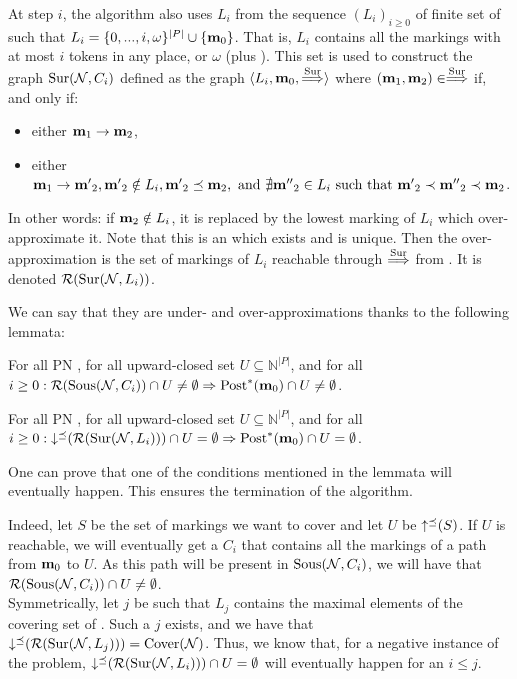 At step $i$, the algorithm also uses $L_i$ from the sequence $(L_i)_{i \geq 0}$ of finite set of \omarks such that $L_i = \{0, ..., i, \omega \}^{|P|} \cup \{\mathbf{m}_0\}$.
That is, $L_i$ contains all the markings with at most $i$ tokens in any place, or $\omega$ (plus \mari).
This set is used to construct the graph $\operatorname{Sur}(\mathcal{N}, C_i)$ defined as the graph $\langle L_i, \mathbf{m}_0, \stackrel{\operatorname{Sur}}{\Longrightarrow} \rangle$ where $(\mathbf{m}_1, \mathbf{m}_2) \in \stackrel{\operatorname{Sur}}{\Longrightarrow}$ if, and only if:
\begin{itemize}
  \item either $\mathbf{m}_1 \rightarrow \mathbf{m}_2$,
  \item either $\mathbf{m}_1 \rightarrow \mathbf{m'}_2, \mathbf{m'}_2 \notin L_i, \mathbf{m'}_2 \preceq \mathbf{m}_2, \text{ and } \nexists \mathbf{m''}_2 \in L_i \text{ such that } \mathbf{m'}_2 \prec \mathbf{m''}_2 \prec \mathbf{m}_2$.
\end{itemize}
In other words: if $\mathbf{m}_2 \notin L_i$, it is replaced by the lowest marking of $L_i$ which over-approximate it.
Note that this is an \omark which exists and is unique. 
Then the over-approximation is the set of markings of $L_i$ reachable through $\stackrel{\operatorname{Sur}}{\Longrightarrow}$ from \mari. It is denoted $\operatorname{\mathcal{R}}(\operatorname{Sur}(\mathcal{N}, L_i))$.

We can say that they are under- and over-approximations thanks to the following lemmata:
\begin{lemm}
  For all \ac{PN} \NPTm, for all upward-closed set $U \subseteq \mathbb{N}^{|P|}$, and for all $i \geq 0: \operatorname{\mathcal{R}}(\operatorname{Sous}(\mathcal{N},C_i)) \cap U \neq \emptyset \Rightarrow \operatorname{Post}^*(\mathbf{m}_0) \cap U \neq \emptyset$.
\end{lemm}
\begin{lemm}
  For all \ac{PN} \NPTm, for all upward-closed set $U \subseteq \mathbb{N}^{|P|}$, and for all $i \geq 0: \operatorname{\downarrow^\preceq}(\operatorname{\mathcal{R}}(\operatorname{Sur}(\mathcal{N},L_i))) \cap U = \emptyset \Rightarrow \operatorname{Post}^*(\mathbf{m}_0) \cap U = \emptyset$.
\end{lemm}

One can prove that one of the conditions mentioned in the lemmata will eventually happen.
This ensures the termination of the algorithm.

Indeed, let $S$ be the set of markings we want to cover and let $U$ be $\operatorname{\uparrow^\preceq}(S)$.
If $U$ is reachable, we will eventually get a $C_i$ that contains all the markings of a path from $\mathbf{m}_0$ to $U$.
As this path will be present in $\operatorname{Sous}(\mathcal{N}, C_i)$, we will have that $\operatorname{\mathcal{R}}(\operatorname{Sous}(\mathcal{N},C_i)) \cap U \neq \emptyset$.\\
Symmetrically, let $j$ be such that $L_j$ contains the maximal elements of the covering set of \N.
Such a $j$ exists, and we have that $\operatorname{\downarrow^\preceq}(\operatorname{\mathcal{R}}(\operatorname{Sur}(\mathcal{N},L_j))) = \operatorname{Cover}(\mathcal{N})$.
Thus, we know that, for a negative instance of the problem, $\operatorname{\downarrow^\preceq}(\operatorname{\mathcal{R}}(\operatorname{Sur}(\mathcal{N},L_i))) \cap U = \emptyset$ will eventually happen for an $i \leq j$.


